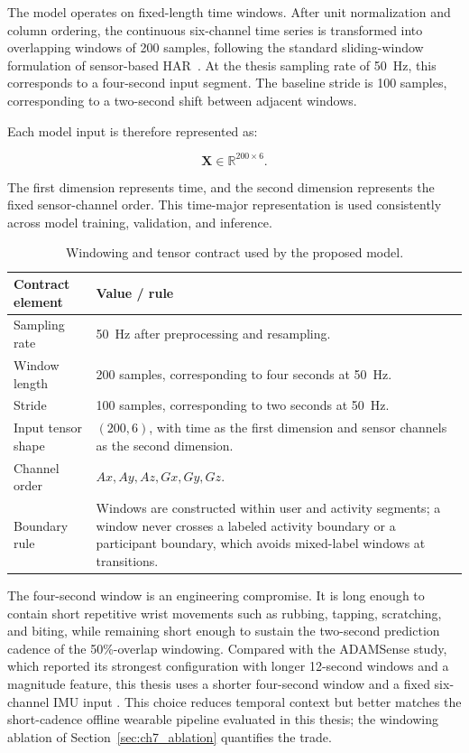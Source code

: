 The model operates on fixed-length time windows. After unit normalization and column ordering, the continuous six-channel time series is transformed into overlapping windows of 200 samples, following the standard sliding-window formulation of sensor-based HAR~\cite{bao2004activity,bulling2014tutorial}. At the thesis sampling rate of 50~Hz, this corresponds to a four-second input segment. The baseline stride is 100 samples, corresponding to a two-second shift between adjacent windows.

Each model input is therefore represented as:

\[
\mathbf{X} \in \mathbb{R}^{200 \times 6}.
\]

The first dimension represents time, and the second dimension represents the fixed sensor-channel order. This time-major representation is used consistently across model training, validation, and inference.

\renewcommand{\arraystretch}{1.15}
\begin{table}[htbp]
\centering
\footnotesize
\caption[Windowing and tensor contract used by the proposed model.]{Windowing and tensor contract used by the proposed model.}
\label{tab:windowing_contract}
\begin{tabularx}{\textwidth}{p{3.7cm} X}
\toprule
\textbf{Contract element} & \textbf{Value / rule} \\
\midrule
Sampling rate & 50~Hz after preprocessing and resampling. \\
Window length & 200 samples, corresponding to four seconds at 50~Hz. \\
Stride & 100 samples, corresponding to two seconds at 50~Hz. \\
Input tensor shape & \((200,6)\), with time as the first dimension and sensor channels as the second dimension. \\
Channel order & \(Ax, Ay, Az, Gx, Gy, Gz\). \\
Boundary rule & Windows are constructed within user and activity segments; a window never crosses a labeled activity boundary or a participant boundary, which avoids mixed-label windows at transitions. \\
\bottomrule
\end{tabularx}
\renewcommand{\arraystretch}{1.0}
\end{table}

The four-second window is an engineering compromise. It is long enough to contain short repetitive wrist movements such as rubbing, tapping, scratching, and biting, while remaining short enough to sustain the two-second prediction cadence of the 50\%-overlap windowing. Compared with the ADAMSense study, which reported its strongest configuration with longer 12-second windows and a magnitude feature, this thesis uses a shorter four-second window and a fixed six-channel IMU input \cite{khan2021adamsense}. This choice reduces temporal context but better matches the short-cadence offline wearable pipeline evaluated in this thesis; the windowing ablation of Section~\ref{sec:ch7_ablation} quantifies the trade.

